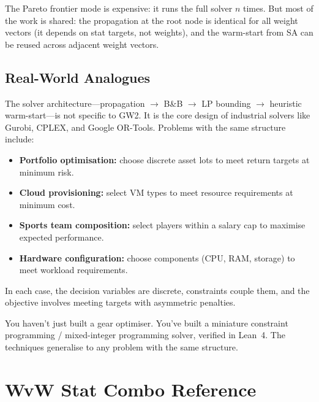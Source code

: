 \documentclass[11pt, a4paper, oneside]{book}
\begin{document}
\begin{intuitionbox}
The Pareto frontier mode is expensive: it runs the full solver $n$ times.
But most of the work is shared: the propagation at the root node is identical
for all weight vectors (it depends on stat targets, not weights), and the
warm-start from SA can be reused across adjacent weight vectors.
\end{intuitionbox}

\section{Real-World Analogues}

The solver architecture---propagation $\to$ B\&B $\to$ LP bounding
$\to$ heuristic warm-start---is not specific to GW2.  It is the core
design of industrial solvers like Gurobi, CPLEX, and Google OR-Tools.
Problems with the same structure include:

\begin{itemize}[nosep]
  \item \textbf{Portfolio optimisation:} choose discrete asset lots to
    meet return targets at minimum risk.
  \item \textbf{Cloud provisioning:} select VM types to meet resource
    requirements at minimum cost.
  \item \textbf{Sports team composition:} select players within a salary
    cap to maximise expected performance.
  \item \textbf{Hardware configuration:} choose components (CPU, RAM,
    storage) to meet workload requirements.
\end{itemize}

In each case, the decision variables are discrete, constraints couple them,
and the objective involves meeting targets with asymmetric penalties.

\begin{intuitionbox}
You haven't just built a gear optimiser.  You've built a miniature
constraint programming / mixed-integer programming solver, verified in
Lean~4.  The techniques generalise to any problem with the same structure.
\end{intuitionbox}

\appendix

\chapter{WvW Stat Combo Reference}
\label{app:combos}
\end{document}
